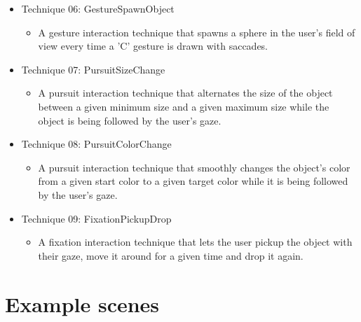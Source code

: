 \documentclass[../../Instructions_Framework]{subfiles}
\begin{document}
\begin{itemize}
		\item Technique 06: GestureSpawnObject
	\begin{itemize}
		\item A gesture interaction technique that spawns a sphere in the user's field of view every time a 'C' gesture is drawn with saccades.
	\end{itemize}
		\item Technique 07: PursuitSizeChange
	\begin{itemize}
		\item A pursuit interaction technique that alternates the size of the object between a given minimum size and a given maximum size while the object is being followed by the user's gaze.
	\end{itemize}
		\item Technique 08: PursuitColorChange
	\begin{itemize}
		\item A pursuit interaction technique that smoothly changes the object's color from a given start color to a given target color while it is being followed by the user's gaze.
	\end{itemize}
		\item Technique 09: FixationPickupDrop
	\begin{itemize}
		\item A fixation interaction technique that lets the user pickup the object with their gaze, move it around for a given time and drop it again.
	\end{itemize}
\end{itemize} 

\section{Example scenes}
\end{document}

